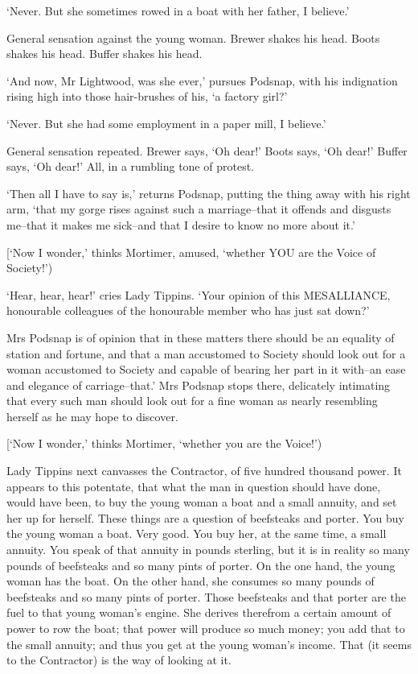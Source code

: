 ‘Never. But she sometimes rowed in a boat with her father, I believe.’

General sensation against the young woman. Brewer shakes his head. Boots
shakes his head. Buffer shakes his head.

‘And now, Mr Lightwood, was she ever,’ pursues Podsnap, with his
indignation rising high into those hair-brushes of his, ‘a factory
girl?’

‘Never. But she had some employment in a paper mill, I believe.’

General sensation repeated. Brewer says, ‘Oh dear!’ Boots says, ‘Oh
dear!’ Buffer says, ‘Oh dear!’ All, in a rumbling tone of protest.

‘Then all I have to say is,’ returns Podsnap, putting the thing away
with his right arm, ‘that my gorge rises against such a marriage--that
it offends and disgusts me--that it makes me sick--and that I desire to
know no more about it.’

[‘Now I wonder,’ thinks Mortimer, amused, ‘whether YOU are the Voice of
Society!’)

‘Hear, hear, hear!’ cries Lady Tippins. ‘Your opinion of this
MESALLIANCE, honourable colleagues of the honourable member who has just
sat down?’

Mrs Podsnap is of opinion that in these matters there should be an
equality of station and fortune, and that a man accustomed to Society
should look out for a woman accustomed to Society and capable of bearing
her part in it with--an ease and elegance of carriage--that.’ Mrs
Podsnap stops there, delicately intimating that every such man should
look out for a fine woman as nearly resembling herself as he may hope to
discover.

[‘Now I wonder,’ thinks Mortimer, ‘whether you are the Voice!’)

Lady Tippins next canvasses the Contractor, of five hundred thousand
power. It appears to this potentate, that what the man in question
should have done, would have been, to buy the young woman a boat and a
small annuity, and set her up for herself. These things are a question
of beefsteaks and porter. You buy the young woman a boat. Very good. You
buy her, at the same time, a small annuity. You speak of that annuity in
pounds sterling, but it is in reality so many pounds of beefsteaks and
so many pints of porter. On the one hand, the young woman has the boat.
On the other hand, she consumes so many pounds of beefsteaks and so many
pints of porter. Those beefsteaks and that porter are the fuel to that
young woman’s engine. She derives therefrom a certain amount of power to
row the boat; that power will produce so much money; you add that to the
small annuity; and thus you get at the young woman’s income. That (it
seems to the Contractor) is the way of looking at it.

